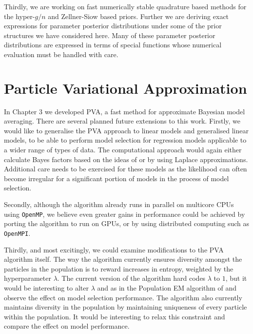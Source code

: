 Thirdly, we are working on fast numerically stable quadrature based methods for
the hyper-$g/n$ and Zellner-Siow based priors. Further we are deriving exact 
expressions for parameter posterior distributions under some of the prior 
structures we have considered here. Many of these parameter posterior distributions
are expressed in terms of special functions whose numerical evaluation must
be handled with care.


\section{Particle Variational Approximation}

In Chapter 3 we developed PVA, a fast method for approximate Bayesian model
averaging. There are several planned future extensions to this work. Firstly,
we would like to generalise the PVA approach to linear models and generalised
linear models, to be able to perform model selection for regression models
applicable to a wider range of types of data. The computational approach would
again either calculate Bayes factors based on the ideas of \cite{Li2015} or by
using Laplace approximations. Additional care needs to be exercised for these
models as the likelihood can often become irregular for a significant portion
of models in the process of model selection.

Secondly, although the algorithm already runs in parallel on multicore CPUs
using \texttt{OpenMP}, we believe even greater gains in performance could be
achieved by porting the algorithm to run on GPUs, or by using distributed
computing such as \texttt{OpenMPI}.

Thirdly, and most excitingly, we could examine modifications to the PVA
algorithm itself. The way the algorithm currently ensures diversity amongst the
particles in the population is to reward increases in entropy, weighted by the
hyperparameter $\lambda$. The current version of the algorithm hard codes
$\lambda$ to $1$, but it would be interesting to alter $\lambda$ and as in the
Population EM algorithm of \cite{Rockova2017} and observe the effect on model
selection performance. The algorithm also currently maintains diversity in the
population by maintaining uniqueness of every particle within the population.
It would be interesting to relax this constraint and compare the effect on
model performance.



